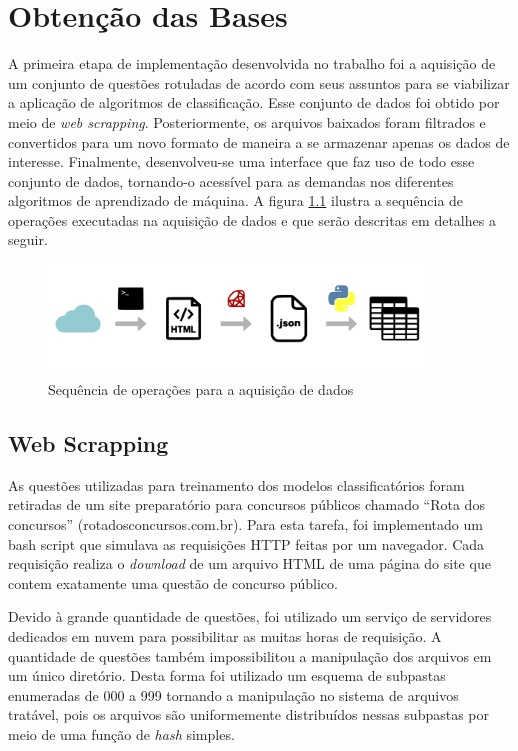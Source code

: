 \chapter{Obtenção das Bases}
\noindent

A primeira etapa de implementação desenvolvida no trabalho foi a aquisição de um conjunto de questões rotuladas de acordo com seus assuntos para se viabilizar a aplicação de algoritmos de classificação. Esse conjunto de dados foi obtido por meio de \textit{web scrapping}. Posteriormente, os arquivos baixados foram filtrados e convertidos para um novo formato de maneira a se armazenar apenas os dados de interesse. Finalmente, desenvolveu-se uma interface que faz uso de todo esse conjunto de dados, tornando-o acessível para as demandas nos diferentes algoritmos de aprendizado de máquina. A figura \ref{fig:data_processing_pipeline} ilustra a sequência de operações executadas na aquisição de dados e que serão descritas em detalhes a seguir.

\begin{figure}[!ht]
	\centering
	\includegraphics[width=0.9\textwidth]{figures/data_processing_pipeline.PNG}
	\caption{Sequência de operações para a aquisição de dados}
	\label{fig:data_processing_pipeline}
\end{figure}

\section{Web Scrapping}

As questões utilizadas para treinamento dos modelos classificatórios foram retiradas de um site preparatório para concursos públicos chamado “Rota dos concursos” (rotadosconcursos.com.br). Para esta tarefa, foi implementado um bash script que simulava as requisições HTTP feitas por um navegador. Cada requisição realiza o \textit{download} de um arquivo HTML de uma página do site que contem exatamente uma questão de concurso público.

Devido à grande quantidade de questões, foi utilizado um serviço de servidores dedicados em nuvem para possibilitar as muitas horas de requisição. A quantidade de questões também impossibilitou a manipulação dos arquivos em um único diretório. Desta forma foi utilizado um esquema de subpastas enumeradas de 000 a 999 tornando a manipulação no sistema de arquivos tratável, pois os arquivos são uniformemente distribuídos nessas subpastas por meio de uma função de \textit{hash} simples.
    

